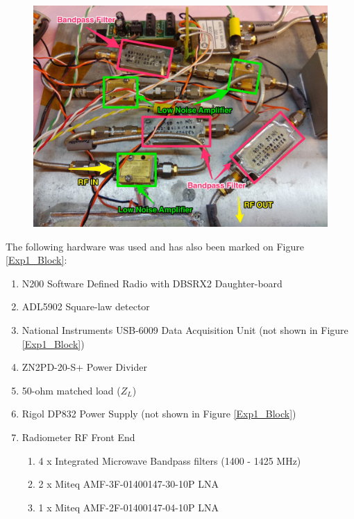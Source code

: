 {\begin{figure}[h!tb] \centering
\includegraphics[width=\textwidth]{Images/ISU_RF_noted.jpg}
\label{ISURF}
\end{figure}
}

The following hardware was used and has also been marked on Figure \ref{Exp1_Block}:

\begin{enumerate}
\item N200 Software Defined Radio with DBSRX2 Daughter-board
\item ADL5902 Square-law detector
\item National Instruments USB-6009 Data Acquisition Unit (not shown in Figure \ref{Exp1_Block})
\item ZN2PD-20-S+ Power Divider
\item 50-ohm matched load ($Z_L$)
\item Rigol DP832 Power Supply (not shown in Figure \ref{Exp1_Block})
\item Radiometer RF Front End
\begin{enumerate}
\item 4 x Integrated Microwave Bandpass filters (1400 - 1425 MHz)
\item 2 x Miteq AMF-3F-01400147-30-10P LNA
\item 1 x Miteq AMF-2F-01400147-04-10P LNA
\end{enumerate}
\end{enumerate}

